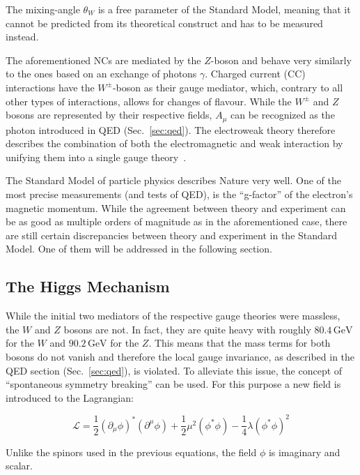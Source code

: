 \noindent The mixing-angle $\theta_W$ is a free parameter of the Standard Model, meaning that it cannot be predicted from its theoretical construct and has to be measured instead.

The aforementioned NCs are mediated by the $Z$-boson and behave very similarly to the ones based on an exchange of photons $\gamma$. Charged current (CC) interactions have the $W^\pm$-boson as their gauge mediator, which, contrary to all other types of interactions, allows for changes of flavour. While the $W^\pm$ and $Z$ bosons are represented by their respective fields, $A_\mu$ can be recognized as the photon introduced in QED (Sec.~\ref{sec:qed}). The electroweak theory therefore describes the combination of both the electromagnetic and weak interaction by unifying them into a single gauge theory~\cite{standardmodel-salam,standardmodel-weinberg,standardmodel-glashow}.

The Standard Model of particle physics describes Nature very well. One of the most precise measurements (and tests of QED), is the ``g-factor'' of the electron's magnetic momentum. While the agreement between theory and experiment can be as good as multiple orders of magnitude as in the aforementioned case, there are still certain discrepancies between theory and experiment in the Standard Model. One of them will be addressed in the following section.

\subsection{The Higgs Mechanism}
\label{sec:higgs}

While the initial two mediators of the respective gauge theories were massless, the $W$ and $Z$ bosons are not. In fact, they are quite heavy with roughly $80.4\,\text{GeV}$ for the $W$ and $90.2\,\text{GeV}$ for the $Z$. This means that the mass terms for both bosons do not vanish and therefore the local gauge invariance, as described in the QED section (Sec.~\ref{sec:qed}), is violated. To alleviate this issue, the concept of ``spontaneous symmetry breaking'' can be used. For this purpose a new field is introduced to the Lagrangian:

\begin{equation}
  \label{eq:higgslagrangian}
  \mathcal{L} =  \frac{1}{2} (\partial_\mu \phi)^* (\partial^\mu \phi)  + \frac{1}{2} \mu^2 (\phi^* \phi) - \frac{1}{4} \lambda (\phi^* \phi)^2
\end{equation}

\noindent Unlike the spinors used in the previous equations, the field $\phi$ is imaginary and scalar.

